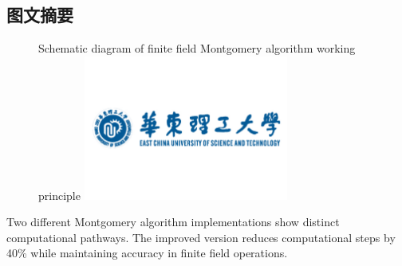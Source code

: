 
\subsection*{图文摘要}

\begin{figure}[H] %
	\centering
	{Schematic diagram of finite field Montgomery algorithm working principle} %
	\includegraphics[width=0.6\textwidth]{figures/figure1.pdf}
\end{figure}

Two different Montgomery algorithm implementations show distinct computational pathways. 
The improved version reduces computational steps by 40\% while maintaining accuracy in finite field operations.



